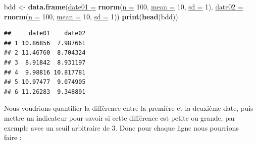 \documentclass[twoside,symmetric]{book}
\newenvironment{Shaded}{}{}
\newcommand{\DataTypeTok}[1]{\underline{#1}}
\newcommand{\DecValTok}[1]{#1}
\newcommand{\KeywordTok}[1]{\textbf{#1}}
\newcommand{\NormalTok}[1]{#1}
\newcommand{\StringTok}[1]{#1}
\begin{document}
\begin{Shaded}
\begin{Highlighting}[]
\NormalTok{bdd <-}\StringTok{ }\KeywordTok{data.frame}\NormalTok{(}\DataTypeTok{date01 =} \KeywordTok{rnorm}\NormalTok{(}\DataTypeTok{n =} \DecValTok{100}\NormalTok{, }\DataTypeTok{mean =} \DecValTok{10}\NormalTok{, }\DataTypeTok{sd =} \DecValTok{1}\NormalTok{), }
                  \DataTypeTok{date02 =} \KeywordTok{rnorm}\NormalTok{(}\DataTypeTok{n =} \DecValTok{100}\NormalTok{, }\DataTypeTok{mean =} \DecValTok{10}\NormalTok{, }\DataTypeTok{sd =} \DecValTok{1}\NormalTok{))}
\KeywordTok{print}\NormalTok{(}\KeywordTok{head}\NormalTok{(bdd))}
\end{Highlighting}
\end{Shaded}

\begin{verbatim}
##     date01    date02
## 1 10.86856  7.987661
## 2 11.46760  8.704324
## 3  8.91842  8.931197
## 4  9.98816 10.817781
## 5 10.97477  9.074905
## 6 11.26283  9.348891
\end{verbatim}

Nous voudrions quantifier la différence entre la première et la deuxième date, puis mettre un indicateur pour savoir si cette différence est petite ou grande, par exemple avec un seuil arbitraire de 3. Donc pour chaque ligne nous pourrions faire :
\end{document}

